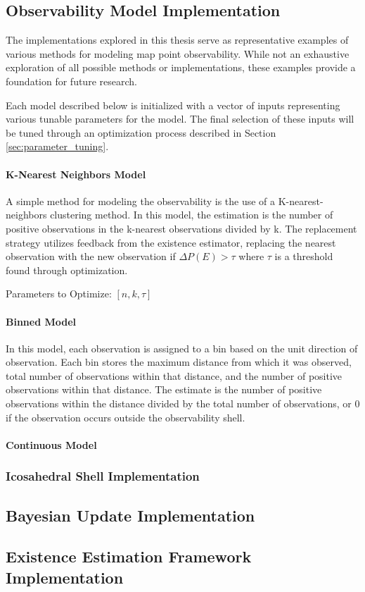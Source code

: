 \subsection{Observability Model Implementation}

The implementations explored in this thesis serve as representative examples of various methods for modeling map point observability. While not an exhaustive exploration of all possible methods or implementations, these examples provide a foundation for future research.

Each model described below is initialized with a vector of inputs representing various tunable parameters for the model. The final selection of these inputs will be tuned through an optimization process described in Section \ref{sec:parameter_tuning}. 

\paragraph{K-Nearest Neighbors Model}

A simple method for modeling the observability is the use of a K-nearest-neighbors clustering method. In this model, the estimation is the number of positive observations in the k-nearest observations divided by k. The replacement strategy utilizes feedback from the existence estimator, replacing the nearest observation with the new observation if $\Delta P(E) > \tau$ where $\tau$ is a threshold found through optimization.

Parameters to Optimize: $[n, k, \tau]$

\paragraph{Binned Model}

In this model, each observation is assigned to a bin based on the unit direction of observation. Each bin stores the maximum distance from which it was observed, total number of observations within that distance, and the number of positive observations within that distance. The estimate is the number of positive observations within the distance divided by the total number of observations, or 0 if the observation occurs outside the observability shell.

\paragraph{Continuous Model}

\subsubsection{Icosahedral Shell Implementation}
\label{sec:icos_construction}

\subsection{Bayesian Update Implementation}

\subsection{Existence Estimation Framework Implementation}